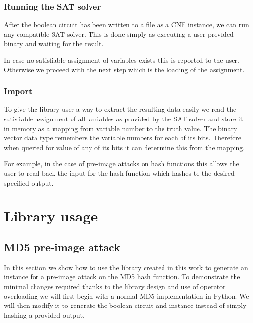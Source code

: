\subsection{Running the SAT solver}
After the boolean circuit has been written to a file as a CNF instance, we can run any compatible SAT solver.
This is done simply as executing a user-provided binary and waiting for the result.

In case no satisfiable assignment of variables exists this is reported to the user.
Otherwise we proceed with the next step which is the loading of the assignment.

\subsection{Import}
To give the library user a way to extract the resulting data easily we read the satisfiable assignment of all variables as provided by the SAT solver and store it in memory as a mapping from variable number to the truth value.
The binary vector data type remembers the variable numbers for each of its bits.
Therefore when queried for value of any of its bits it can determine this from the mapping.

For example, in the case of pre-image attacks on hash functions this allows the user to read back the input for the hash function which hashes to the desired specified output.

\chapter{Library usage}

\section{MD5 pre-image attack}
In this section we show how to use the library created in this work to generate an instance for a pre-image attack on the MD5 hash function.
To demonstrate the minimal changes required thanks to the library design and use of operator overloading we will first begin with a normal MD5 implementation in Python.
We will then modify it to generate the boolean circuit and instance instead of simply hashing a provided output.

